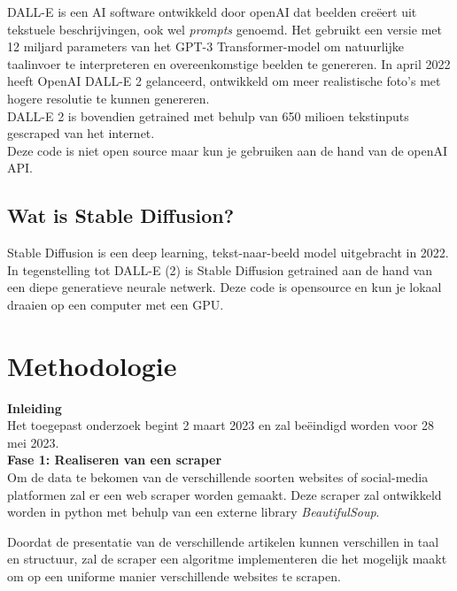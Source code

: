 \noindent
DALL-E is een AI software ontwikkeld door openAI dat beelden creëert uit tekstuele beschrijvingen, ook wel \emph{prompts} genoemd. Het gebruikt een versie met 12 miljard parameters van het GPT-3 Transformer-model om natuurlijke taalinvoer te interpreteren en overeenkomstige beelden te genereren. In april 2022 heeft OpenAI DALL-E 2 gelanceerd, ontwikkeld om meer realistische foto's met hogere resolutie te kunnen genereren. \autocite{DallEWikipediaNL}  \autocite{DallEWikipediaEN}\\

\noindent
DALL-E 2 is bovendien getrained met behulp van 650 milioen tekstinputs gescraped van het internet. \autocite{Borji2022} \\

\noindent
Deze code is niet open source maar kun je gebruiken aan de hand van de openAI API.  \\
\subsection{Wat is Stable Diffusion?}
\noindent
Stable Diffusion is een deep learning, tekst-naar-beeld model uitgebracht in 2022. In tegenstelling tot DALL-E (2) is Stable Diffusion getrained aan de hand van een diepe generatieve neurale netwerk.  Deze code is opensource en kun je lokaal draaien op een computer met een GPU.
\autocite{StableDifWikipediaEN}



\section{Methodologie}%
\label{sec:methodologie}
\noindent
\textbf{Inleiding} \\
Het toegepast onderzoek begint 2 maart 2023 en zal beëindigd worden voor 28 mei 2023. \\

\noindent
\textbf{Fase 1: Realiseren van een scraper} \\
Om de data te bekomen van de verschillende soorten websites of social-media platformen zal er een web scraper worden gemaakt. Deze scraper zal ontwikkeld worden in python met behulp van een externe library \emph{BeautifulSoup}.

\noindent
Doordat de presentatie van de verschillende artikelen kunnen verschillen in taal en structuur, zal de scraper een algoritme implementeren die het mogelijk maakt om op een uniforme manier verschillende websites te scrapen. \\

